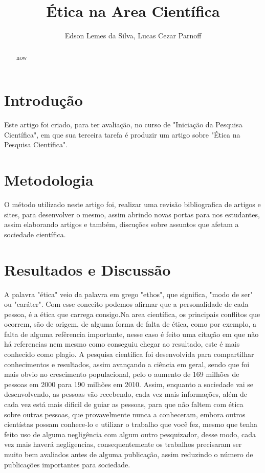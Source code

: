 \documentclass[12pt]{article}
\title{Ética na Area Cientí­fica}
\author{Edson Lemes da Silva, Lucas Cezar Parnoff}
\begin{document}
 

\maketitle

\begin{abstract}
  now
\end{abstract}
     
\begin{resumo} 
  
\end{resumo}


\section{Introdução}\label{sec:introducao}
Este artigo foi criado, para ter avaliação,
no curso de "Iniciação da Pesquisa Científica",
em que sua terceira tarefa é produzir um artigo
sobre "Ética na Pesquisa Científica".
\section{Metodologia} \label{sec:desenvolv}
O método utilizado neste artigo foi, realizar uma 
revisão bibliografica de artigos e sites, 
para desenvolver o mesmo, assim abrindo novas portas
para nos estudantes, assim elaborando artigos e
também, discuções sobre assuntos que afetam a 
sociedade científica.  
\section{Resultados e Discussão}\label{sec:resuldisc}
A palavra "ética" veio da palavra em grego "ethos", que
significa, "modo de ser" ou "caráter"\cite{signi:etmo}.
Com esse conceito podemos afirmar que a personalidade de
cada pessoa, é a ética que carrega consigo.Na area
científica, os principais conflitos que ocorrem, são
de origem, de alguma forma de falta de ética, como por 
exemplo, a falta de alguma refêrencia importante, nesse 
caso é feito uma citação em que não há referencias nem 
mesmo como conseguiu chegar ao resultado, este é mais 
conhecido como plagio.
A pesquisa científica foi desenvolvida para compartilhar 
conhecimentos e resultados, assim avançando a ciência 
em geral, sendo que foi mais obvio no crescimento 
populacional, pelo o aumento de 169 milhões de pessoas 
em 2000\cite{censo:00} para 190 milhões em 2010\cite{censo:10}.
Assim, enquanto a sociedade vai se desenvolvendo,
as pessoas vão recebendo, cada vez mais informações,
além de cada vez está mais dificil de guiar as
pessoas, para que não faltem com ética sobre 
outras pessoas, que provavelmente nunca a conheceram,
embora outros cientístas possam conhece-lo e utilizar
o trabalho que você fez, mesmo que tenha
feito uso de alguma negligência com algum outro 
pesquizador, desse modo, cada vez mais haverá
negligencias, consequentemente os
trabalhos precisaram ser muito bem avaliados
antes de alguma publicação, assim reduzindo
o número de publicações importantes para 
sociedade.




 



\end{document}
